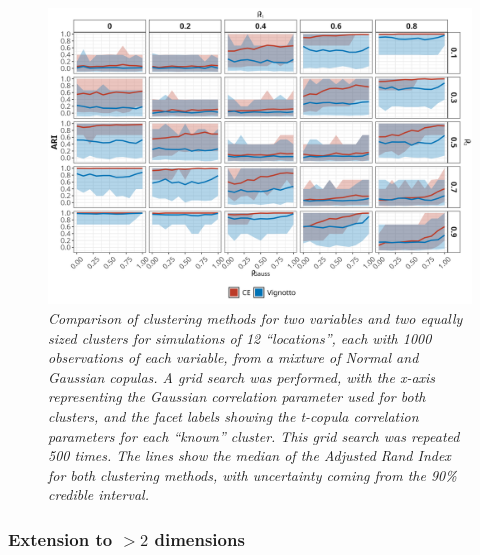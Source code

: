 \documentclass{article}
\numberwithin{equation}{section}
\begin{document}
\begin{figure}[H]
    \centering
    \includegraphics[width = 0.9\linewidth]{plots/sim_01b_ce_vs_vi_dqu_0.9.png}
    \caption{\emph{Comparison of clustering methods for two variables and two equally sized clusters for simulations of 12 ``locations'', each with 1000 observations of each variable, from a mixture of Normal and Gaussian copulas. A grid search was performed,  with the x-axis representing the Gaussian correlation parameter used for both clusters, and the facet labels showing the t-copula correlation parameters for each ``known'' cluster. This grid search was repeated 500 times. The lines show the median of the Adjusted Rand Index for both clustering methods, with uncertainty coming from the 90\% credible interval.}} %
    \label{fig:01_ce_vs_vi}
\end{figure}


\subsubsection{Extension to $>2$ dimensions} \label{subsubsec:sim_extension}

\end{document}
